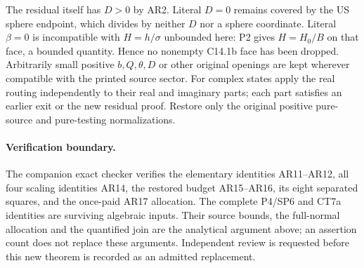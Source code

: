 The residual itself has $D>0$ by AR2. Literal $D=0$ remains
covered by the US sphere endpoint, which divides by neither
$D$ nor a sphere coordinate. Literal $\beta=0$ is incompatible
with $H=h/\sigma$ unbounded here: P2 gives $H=H_0/B$ on
that face, a bounded quantity. Hence no nonempty C14.1b face
has been dropped. Arbitrarily small positive $b,Q,\theta,D$
or other original openings are kept wherever compatible with
the printed source sector. For complex states apply the real
routing independently to their real and imaginary parts;
each part satisfies an earlier exit or the new residual proof.
Restore only the original positive pure-source and pure-testing
normalizations.

\paragraph{Verification boundary.}
The companion exact checker verifies the elementary identities
AR11--AR12, all four scaling identities AR14, the restored
budget AR15--AR16, its eight separated squares, and the
once-paid AR17 allocation. The complete P4/SP6 and CT7a
identities are surviving algebraic inputs. Their source bounds,
the full-normal allocation and the quantified join are the
analytical argument above; an assertion count does not replace
these arguments. Independent review is requested before this
new theorem is recorded as an admitted replacement.
